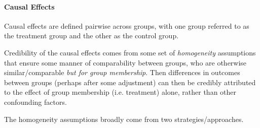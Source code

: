 \documentclass[12pt]{article}
\theoremstyle{plain}
\theoremstyle{definition}
\theoremstyle{remark}
\begin{document}
\paragraph{Causal Effects}
Causal effects are defined pairwise across groups, with one group
referred to as the treatment group and the other as the control group.

Credibility of the causal effects comes from some set of
\emph{homogeneity} assumptions that ensure some manner of
comparability between groups, who are otherwise similar/comparable
\emph{but for group membership}.
Then differences in outcomes between groups (perhaps after some
adjustment) can then be credibly attributed to the effect of group
membership (i.e. treatment) alone, rather than other confounding
factors.

The homogeneity assumptions broadly come from two
strategies/approaches.
\end{document}
